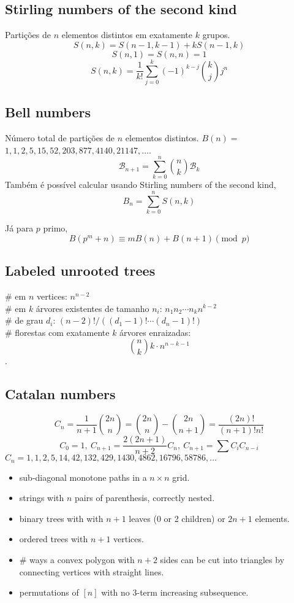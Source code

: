 	\subsection{Stirling numbers of the second kind}
		Partições de $n$ elementos distintos em exatamente $k$ grupos.
		$$S(n,k) = S(n-1,k-1) + k S(n-1,k)$$
		$$S(n,1) = S(n,n) = 1$$
		$$S(n,k) = \frac{1}{k!}\sum_{j=0}^k (-1)^{k-j}\binom{k}{j}j^n$$

	\subsection{Bell numbers}
		Número total de partições de $n$ elementos distintos. $B(n) =$
		$1, 1, 2, 5, 15, 52, 203, 877, 4140, 21147, \dots$. 
		\begin{equation*}
        \mathcal{B}_{n+1} = \sum_{k=0}^n \binom{n}{k} \mathcal{B}_k
      \end{equation*}
      Também é possível calcular usando Stirling numbers of the second kind,
      \[B_n = \sum_{k = 0}^{n} S(n, k)\]

      Já para $p$ primo,
		\[ B(p^m+n)\equiv mB(n)+B(n+1) \pmod{p} \]

	\subsection{Labeled unrooted trees}
		\# em $n$ vertices: $n^{n-2}$\\
		\# em $k$ árvores existentes de tamanho $n_i$: $n_1n_2\cdots n_k n^{k-2}$ \\
		\# de grau $d_i$: $(n-2)! / ((d_1-1)! \cdots (d_n-1)!)$\\
		\# florestas com exatamente $k$ árvores enraizadas: $$\binom{n}{k} k \cdot n^{n-k-1}$$.
   
    
	\subsection{Catalan numbers}
		\[ C_n=\frac{1}{n+1}\binom{2n}{n}= \binom{2n}{n}-\binom{2n}{n+1} = \frac{(2n)!}{(n+1)!n!} \]
		\[ C_0=1,\ C_{n+1} = \frac{2(2n+1)}{n+2}C_n,\ C_{n+1}=\sum C_iC_{n-i} \]
		${C_n = 1, 1, 2, 5, 14, 42, 132, 429, 1430, 4862, 16796, 58786, \dots}$
		\begin{itemize}[noitemsep]
			\item sub-diagonal monotone paths in a $n\times n$ grid.
			\item strings with $n$ pairs of parenthesis, correctly nested.
			\item binary trees with with $n+1$ leaves (0 or 2 children) or $2n + 1$ elements.
			\item ordered trees with $n+1$ vertices.
			\item \# ways a convex polygon with $n+2$ sides can be cut into triangles by connecting vertices with straight lines.
			\item permutations of $[n]$ with no 3-term increasing subsequence.
		\end{itemize}

